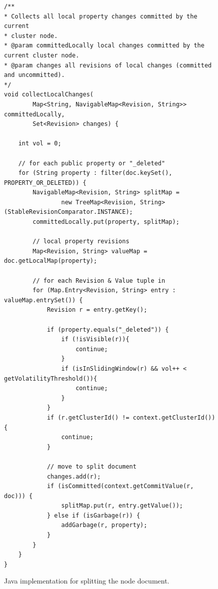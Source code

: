 \documentclass[abstracton,12pt]{scrreprt}
\begin{document}
\begin{figure}[h]
    \begin{framed}
        \begin{scriptsize}
            \begin{verbatim}
/**
* Collects all local property changes committed by the current
* cluster node.
* @param committedLocally local changes committed by the current cluster node.
* @param changes all revisions of local changes (committed and uncommitted).
*/
void collectLocalChanges(
        Map<String, NavigableMap<Revision, String>> committedLocally,
        Set<Revision> changes) {

    int vol = 0;
    
    // for each public property or "_deleted"
    for (String property : filter(doc.keySet(), PROPERTY_OR_DELETED)) {
        NavigableMap<Revision, String> splitMap =
                new TreeMap<Revision, String>(StableRevisionComparator.INSTANCE);
        committedLocally.put(property, splitMap);

        // local property revisions
        Map<Revision, String> valueMap = doc.getLocalMap(property);
        
        // for each Revision & Value tuple in 
        for (Map.Entry<Revision, String> entry : valueMap.entrySet()) {
            Revision r = entry.getKey();

            if (property.equals("_deleted")) {
                if (!isVisible(r)){
                    continue;
                }
                if (isInSlidingWindow(r) && vol++ < getVolatilityThreshold()){
                    continue;
                }
            }
            if (r.getClusterId() != context.getClusterId()) {
                continue;
            }

            // move to split document
            changes.add(r);
            if (isCommitted(context.getCommitValue(r, doc))) {
                splitMap.put(r, entry.getValue());
            } else if (isGarbage(r)) {
                addGarbage(r, property);
            }
        }
    }
}
            \end{verbatim}
        \end{scriptsize}
    \end{framed}
    \caption{Java implementation for splitting the node document.}
    \label{algo:split_document}
\end{figure}
\end{document}
